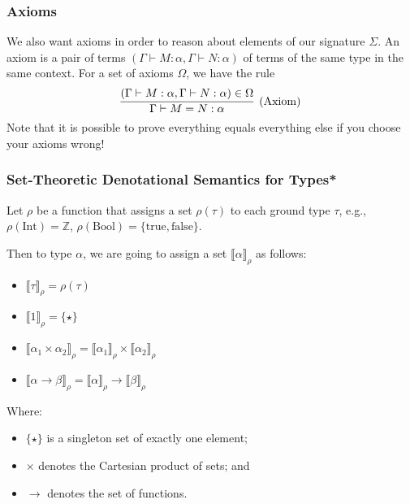\documentclass[aspectratio=169]{beamer}
\begin{document}
\begin{frame}
\frametitle{Axioms}
We also want axioms in order to reason about elements of our signature $\Sigma$.
An axiom is a pair of terms $\left(\Gamma \vdash M : \alpha, \Gamma \vdash N : \alpha\right)$ of terms of the same type in the same context.
For a set of axioms $\Omega$, we have the rule
\[
\infer[\text{(Axiom)}]{\Gamma \vdash M = N : \alpha}{\left(\Gamma \vdash M : \alpha, \Gamma \vdash N : \alpha\right) \in \Omega}
\]
Note that it is possible to prove everything equals everything else if you choose your axioms wrong!
\end{frame}

\begin{frame}
\frametitle{Set-Theoretic Denotational Semantics for Types*}

Let $\rho$ be a function that assigns a set $\rho(\tau)$ to each ground type $\tau$, e.g., $\rho(\text{Int}) = \mathbb{Z}$, $\rho(\text{Bool}) = \{ \text{true}, \text{false} \}$.

\pause
\medskip

Then to type $\alpha$, we are going to assign a set $\llbracket \alpha \rrbracket_{\rho}$ as follows:

\begin{itemize}
    \item $\llbracket \tau \rrbracket_{\rho} = \rho(\tau)$
    \item $\llbracket 1 \rrbracket_{\rho} = \{\star\}$
    \item $\llbracket \alpha_1 \times \alpha_2 \rrbracket_{\rho} = \llbracket \alpha_1 \rrbracket_{\rho} \times \llbracket \alpha_2 \rrbracket_{\rho}$
    \item $\llbracket \alpha \rightarrow \beta \rrbracket_{\rho} = \llbracket \alpha \rrbracket_{\rho} \rightarrow \llbracket \beta \rrbracket_{\rho}$
\end{itemize}

Where:
\begin{itemize}
    \item $\{\star\}$ is a singleton set of exactly one element;
    \item $\times$ denotes the Cartesian product of sets; and
    \item $\rightarrow$ denotes the set of functions.
\end{itemize}
\end{frame}
\end{document}
